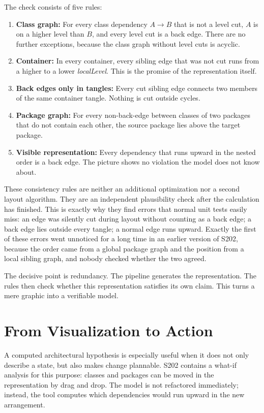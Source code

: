 \documentclass[a4paper,11pt]{article}
\begin{document}
The check consists of five rules:

\begin{enumerate}
  \item \textbf{Class graph:} For every class dependency $A \to B$ that is not
        a level cut, $A$ is on a higher level than $B$, and every level cut is
        a back edge. There are no further exceptions, because the class graph
        without level cuts is acyclic.
  \item \textbf{Container:} In every container, every sibling edge that was not
        cut runs from a higher to a lower \emph{localLevel}. This is the promise
        of the representation itself.
  \item \textbf{Back edges only in tangles:} Every cut sibling edge connects
        two members of the same container tangle. Nothing is cut outside cycles.
  \item \textbf{Package graph:} For every non-back-edge between classes of two
        packages that do not contain each other, the source package lies above
        the target package.
  \item \textbf{Visible representation:} Every dependency that runs upward in
        the nested order is a back edge. The picture shows no violation the model
        does not know about.
\end{enumerate}

These consistency rules are neither an additional optimization nor a second
layout algorithm. They are an independent plausibility check after the
calculation has finished. This is exactly why they find errors that normal
unit tests easily miss: an edge was silently cut during layout without
counting as a back edge; a back edge lies outside every tangle; a normal edge
runs upward. Exactly the first of these errors went unnoticed for a long time
in an earlier version of S202, because the order came from a global package
graph and the position from a local sibling graph, and nobody checked whether
the two agreed.

The decisive point is redundancy. The pipeline generates the representation.
The rules then check whether this representation satisfies its own claim. This
turns a mere graphic into a verifiable model.

\section{From Visualization to Action}

A computed architectural hypothesis is especially useful when it does not only
describe a state, but also makes change plannable. S202 contains a what-if
analysis for this purpose: classes and packages can be moved in the
representation by drag and drop. The model is not refactored immediately;
instead, the tool computes which dependencies would run upward in the new
arrangement.
\end{document}
